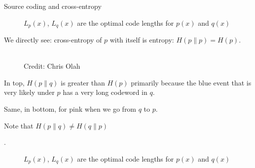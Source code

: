 \documentclass[11pt,compress,t,notes=noshow, xcolor=table]{beamer}
\begin{document}
\begin{vbframe} {Source coding and cross-entropy}
\begin{figure}
    \centering
      \caption{\footnotesize{$L_p(x)$, $L_q(x)$ are the optimal code lengths for $p(x)$ and $q(x)$}}
  \end{figure}
  
We directly see: cross-entropy of $p$ with itself is entropy: $H(p \| p) = H(p)$.
  
\framebreak
  \begin{figure}
    \centering
      \tiny{\\ Credit: Chris Olah}
  \end{figure}
  
  \begin{itemize}
    \item \small{In top, $H(p \| q)$ is greater than $H(p)$ primarily because the blue event that is very likely under $p$ has a very long codeword in $q$.
    \item Same, in bottom, for pink when we go from $q$ to $p$.
    \item Note that $H(p \| q) \neq H(q \| p)$}. 
  \end{itemize}

  \framebreak

  \begin{figure}
    \centering
      \caption{\footnotesize{$L_p(x)$, $L_q(x)$ are the optimal code lengths for $p(x)$ and $q(x)$}}
  \end{figure}
  

\end{vbframe}
\end{document}
